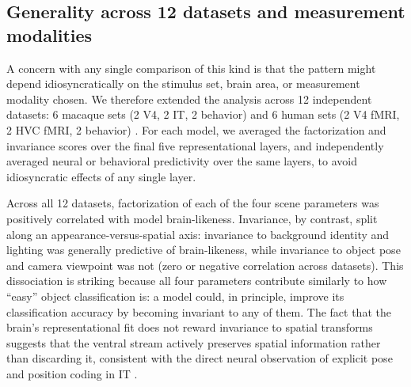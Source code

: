 \documentclass[11pt]{article}
\begin{document}
\subsection{Generality across 12 datasets and measurement modalities}

A concern with any single comparison of this kind is that the pattern might
depend idiosyncratically on the stimulus set, brain area, or measurement
modality chosen. We therefore extended the analysis across 12 independent
datasets: 6 macaque sets (2 V4, 2 IT, 2 behavior) and 6 human sets (2 V4
fMRI, 2 HVC fMRI, 2 behavior)
\citep{majaj2015simple, hong2016explicit, rajalingham2018large,
khalighrazavi2014deep}. For each model, we averaged the factorization and
invariance scores over the final five representational layers, and
independently averaged neural or behavioral predictivity over the same
layers, to avoid idiosyncratic effects of any single layer.

Across all 12 datasets, factorization of each of the four scene parameters
was positively correlated with model brain-likeness. Invariance, by contrast,
split along an appearance-versus-spatial axis: invariance to background
identity and lighting was generally predictive of brain-likeness, while
invariance to object pose and camera viewpoint was not (zero or negative
correlation across datasets). This dissociation is striking because all
four parameters contribute similarly to how ``easy'' object classification
is: a model could, in principle, improve its classification accuracy by
becoming invariant to any of them. The fact that the brain's
representational fit does not reward invariance to spatial transforms
suggests that the ventral stream actively preserves spatial information
rather than discarding it, consistent with the direct neural observation of
explicit pose and position coding in IT \citep{hong2016explicit}.
\end{document}
